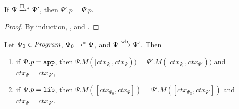\begin{lemma} \label{lemma:appendix:nacl:stepbox-preserves-p}
  If $\Psi \stepboxstar \Psi'$, then $\Psi'.p = \Psi.p$.
\end{lemma}
\begin{proof}
  By induction, , and .
\end{proof}

\begin{lemma} \label{lemma:appendix:nacl:context-integrity}
  Let $\Psi_0 \in \mathit{Program}$, $\Psi_0 \mathrel{\mathrel{\rightarrow}^{\ast}} \Psi$, and $\Psi \mathrel{\xrightarrow{\!\text{wb}}} \Psi'$.
  Then
  \begin{enumerate}
  \item if $\Psi.p = \mathtt{app}$, then $\Psi.M([ctx_{\Psi_0}, ctx_{\Psi})) = \Psi'.M([ctx_{\Psi_0}, ctx_{\Psi'}))$ and $ctx_{\Psi} = ctx_{\Psi'}$,
  \item if $\Psi.p = \mathtt{lib}$, then $\Psi.M([ctx_{\Psi_0}, ctx_{\Psi}]) = \Psi'.M([ctx_{\Psi_0}, ctx_{\Psi'}])$ and $ctx_{\Psi} = ctx_{\Psi'}$.
  \end{enumerate}
\end{lemma}
